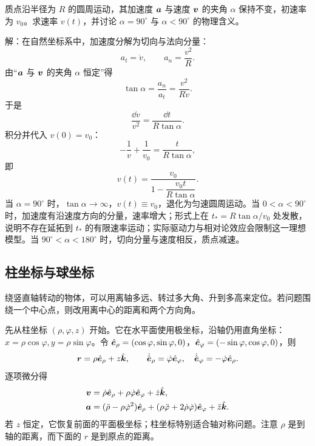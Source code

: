 \begin{example}[加速度与速度夹角恒定的圆周运动]
质点沿半径为 $R$ 的圆周运动，其加速度 $\boldsymbol{a}$ 与速度 $\boldsymbol{v}$ 的夹角 $\alpha$ 保持不变，初速率为 $v_0$。求速率 $v(t)$，并讨论 $\alpha=90^\circ$ 与 $\alpha<90^\circ$ 的物理含义。

\begin{center}
\end{center}

解：在自然坐标系中，加速度分解为切向与法向分量：
\[
a_t=\dot v,\qquad a_n=\frac{v^2}{R}.
\]
由“$\boldsymbol{a}$ 与 $\boldsymbol{v}$ 的夹角 $\alpha$ 恒定”得
\[
\tan\alpha=\frac{a_n}{a_t}
=\frac{v^2}{R\dot v}.
\]
于是
\[
\frac{\dd v}{v^2}=\frac{\dd t}{R\tan\alpha}.
\]
积分并代入 $v(0)=v_0$：
\[
-\frac1v+\frac1{v_0}=\frac{t}{R\tan\alpha},
\]
即
\[
v(t)=\frac{v_0}{1-\dfrac{v_0t}{R\tan\alpha}} .
\]
当 $\alpha=90^\circ$ 时，$\tan\alpha\to\infty$，$v(t)\equiv v_0$，退化为匀速圆周运动。当 $0<\alpha<90^\circ$ 时，加速度有沿速度方向的分量，速率增大；形式上在 $t_*=R\tan\alpha/v_0$ 处发散，说明不存在延拓到 $t_*$ 的有限速率运动；实际驱动力与相对论效应会限制这一理想模型。当 $90^\circ<\alpha<180^\circ$ 时，切向分量与速度相反，质点减速。
\end{example}

\subsection{柱坐标与球坐标}

绕竖直轴转动的物体，可以用离轴多远、转过多大角、升到多高来定位。若问题围绕一个中心点，则改用离中心的距离和两个方向角。

先从柱坐标 $(\rho,\varphi,z)$ 开始。它在水平面使用极坐标，沿轴仍用直角坐标：$x=\rho\cos\varphi,y=\rho\sin\varphi$。令 $\hat{\boldsymbol{e}}_\rho=(\cos\varphi,\sin\varphi,0)$，$\hat{\boldsymbol{e}}_\varphi=(-\sin\varphi,\cos\varphi,0)$，则
\[
\boldsymbol{r}=\rho\hat{\boldsymbol{e}}_\rho+z\hat{\boldsymbol{k}},\qquad
\dot{\hat{\boldsymbol{e}}}_\rho=\dot\varphi\hat{\boldsymbol{e}}_\varphi,\quad
\dot{\hat{\boldsymbol{e}}}_\varphi=-\dot\varphi\hat{\boldsymbol{e}}_\rho.
\]
逐项微分得
\begin{align}
\boldsymbol{v}&=\dot\rho\hat{\boldsymbol{e}}_\rho+\rho\dot\varphi\hat{\boldsymbol{e}}_\varphi+\dot z\hat{\boldsymbol{k}},\\
\boldsymbol{a}&=(\ddot\rho-\rho\dot\varphi^2)\hat{\boldsymbol{e}}_\rho
+(\rho\ddot\varphi+2\dot\rho\dot\varphi)\hat{\boldsymbol{e}}_\varphi+\ddot z\hat{\boldsymbol{k}}.
\end{align}
若 $z$ 恒定，它恢复前面的平面极坐标；柱坐标特别适合轴对称问题。注意 $\rho$ 是到轴的距离，而下面的 $r$ 是到原点的距离。

